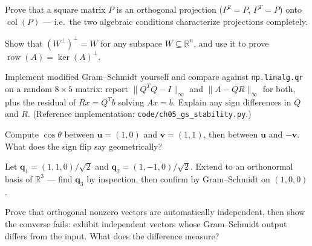 \begin{exercise}[hard]
Prove that a square matrix $P$ is an orthogonal projection
($P^2=P$, $P^{T}=P$) onto $\operatorname{col}(P)$ --- i.e.\ the two algebraic
conditions characterize projections completely.
\end{exercise}

\begin{exercise}[hard]
Show that $(W^\perp)^\perp=W$ for any subspace $W\subseteq\mathbb R^n$, and
use it to prove $\operatorname{row}(A)=\ker(A)^\perp$.
\end{exercise}

\begin{exercise}[hard]
Implement modified Gram--Schmidt yourself and compare against
\texttt{np.linalg.qr} on a random $8\times5$ matrix: report
$\|Q^{T}Q-I\|_\infty$ and $\|A-QR\|_\infty$ for both, plus the residual of
$Rx=Q^{T}b$ solving $Ax=b$. Explain any sign differences in $Q$ and $R$.
(Reference implementation: \texttt{code/ch05\_gs\_stability.py}.)
\end{exercise}
\begin{exercise}[easy]
Compute $\cos\theta$ between $\mathbf{u}=(1,0)$ and
$\mathbf{v}=(1,1)$, then between $\mathbf u$ and $-\mathbf v$. What
does the sign flip say geometrically?
\end{exercise}
\begin{exercise}[medium]
Let $\mathbf{q}_1=(1,1,0)/\sqrt2$ and $\mathbf{q}_2=(1,-1,0)/\sqrt2$.
Extend to an orthonormal basis of $\mathbb{R}^3$ --- find
$\mathbf{q}_3$ by inspection, then confirm by Gram--Schmidt on
$(1,0,0)$.
\end{exercise}
\begin{exercise}[hard]
Prove that orthogonal nonzero vectors are automatically independent,
then show the converse fails: exhibit independent vectors whose
Gram--Schmidt output differs from the input. What does the difference
measure?
\end{exercise}

